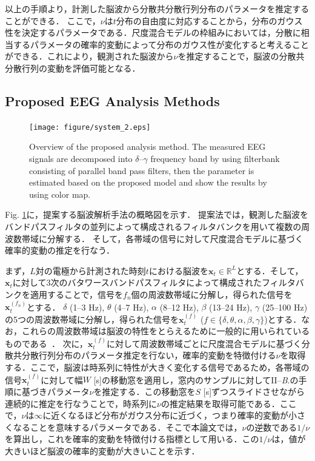 \documentclass[journal]{IEEEtran}
\begin{document}
以上の手順より，計測した脳波から分散共分散行列分布のパラメータを推定することができる．
ここで，$\nu$は$t$分布の自由度に対応することから，分布のガウス性を決定するパラメータである．尺度混合モデルの枠組みにおいては，分散に相当するパラメータの確率的変動によって分布のガウス性が変化すると考えることができる．これにより，観測された脳波から$\nu$を推定することで，脳波の分散共分散行列の変動を評価可能となる．

\subsection{Proposed EEG Analysis Methods}
\begin{figure}[!ht]
\centering
\texttt{[image: figure/system\_2.eps]}
\caption{Overview of the proposed analysis method. The measured EEG signals are decomposed into $\delta$--$\gamma$ frequency band by using filterbank consisting of parallel band pass filters, then the parameter is estimated based on the proposed model and show the results by using color map.}
\label{fig:system}
\end{figure}
Fig. \ref{fig:system}に，提案する脳波解析手法の概略図を示す．
提案法では，観測した脳波をバンドパスフィルタの並列によって構成されるフィルタバンクを用いて複数の周波数帯域に分解する．
そして，各帯域の信号に対して尺度混合モデルに基づく確率的変動の推定を行なう．

まず，$L$対の電極から計測された時刻$t$における脳波を$\mathbf{x}_t \in \mathbb{R}^L$とする．そして，$\mathbf{x}_t$に対して3次のバタワースバンドパスフィルタによって構成されたフィルタバンクを適用することで，信号を$f_n$個の周波数帯域に分解し，得られた信号を$\mathbf{x}^{(f_n)}_t$とする．
$\delta$ (1--3 Hz), $\theta$ (4--7 Hz), $\alpha$ (8--12 Hz), $\beta$ (13--24 Hz), $\gamma$ (25--100 Hz) の5つの周波数帯域に分解し，得られた信号を$\mathbf{x}^{(f)}_t$ ($f \in\{\delta, \theta, \alpha,\beta, \gamma\}$)とする．なお，これらの周波数帯域は脳波の特性をとらえるために一般的に用いられているものである~\cite{ep1994}．
次に，$\mathbf{x}^{(f)}_t$に対して周波数帯域ごとに尺度混合モデルに基づく分散共分散行列分布のパラメータ推定を行ない，確率的変動を特徴付ける$\nu$を取得する．ここで，脳波は時系列に特性が大きく変化する信号であるため，各帯域の信号$\mathbf{x}^{(f)}_t$に対して幅$W$ [s]の移動窓を適用し，窓内のサンプルに対してII--\textit{B}.の手順に基づきパラメータ$\nu$を推定する．この移動窓を$S$ [s]ずつスライドさせながら連続的に推定を行なうことで，時系列に$\nu$の推定結果を取得可能である．ここで，$\nu$は$\infty$に近くなるほど分布がガウス分布に近づく，つまり確率的変動が小さくなることを意味するパラメータである．そこで本論文では，$\nu$の逆数である$1/\nu$を算出し，これを確率的変動を特徴付ける指標として用いる．この$1/\nu$は，値が大きいほど脳波の確率的変動が大きいことを示す．
\end{document}
